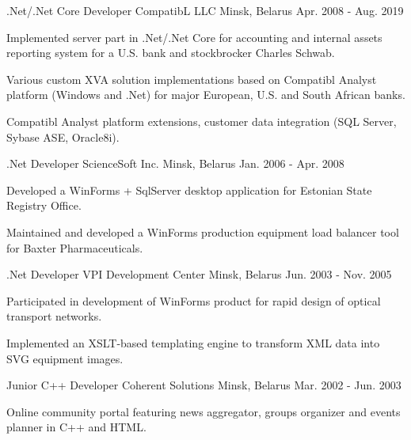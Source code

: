 \begin{cventries}
  \cventry
    {.Net/.Net Core Developer} %
    {CompatibL LLC} %
    {Minsk, Belarus} %
    {Apr. 2008 - Aug. 2019} %
    {
      \begin{cvitems} %
        \item {Implemented server part in .Net/.Net Core for accounting and internal assets reporting system for a U.S. bank and stockbrocker Charles Schwab.}
        \item {Various custom XVA solution implementations based on Compatibl Analyst platform (Windows and .Net) for major European, U.S. and South African banks.}
        \item {Compatibl Analyst platform extensions, customer data integration (SQL Server, Sybase ASE, Oracle8i).}  
      \end{cvitems}
    }

  \cventry
    {.Net Developer} %
    {ScienceSoft Inc.} %
    {Minsk, Belarus} %
    {Jan. 2006 - Apr. 2008} %
    {
      \begin{cvitems} %
        \item {Developed a WinForms + SqlServer desktop application for Estonian State Registry Office.}
        \item {Maintained and developed a WinForms production equipment load balancer tool for Baxter Pharmaceuticals.}
      \end{cvitems}
    }

  \cventry
    {.Net Developer} %
    {VPI Development Center} %
    {Minsk, Belarus} %
    {Jun. 2003 - Nov. 2005} %
    {
      \begin{cvitems} %
        \item {Participated in development of WinForms product for rapid design of optical transport networks.}
        \item {Implemented an XSLT-based templating engine to transform XML data into SVG equipment images.}
      \end{cvitems}
    }

  \cventry
    {Junior C++ Developer} %
    {Coherent Solutions} %
    {Minsk, Belarus} %
    {Mar. 2002 - Jun. 2003} %
    {
      \begin{cvitems} %
        \item {Online community portal featuring news aggregator, groups organizer and events planner in C++ and HTML.}
      \end{cvitems}
    }

\end{cventries}
